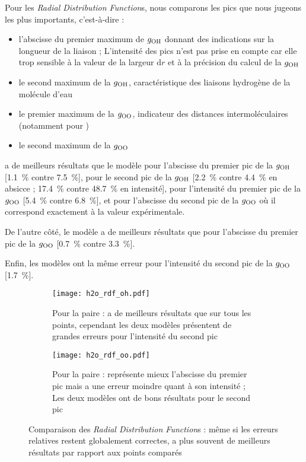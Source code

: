 Pour les \emph{Radial Distribution Function}s, nous comparons les pics que nous jugeons les plus importants, c'est-à-dire :
\begin{itemize}
    \item l'abscisse du premier maximum de $g_{\ce{OH}}$ donnant des indications sur la longueur de la liaison  ; L'intensité des pics n'est pas prise en compte car elle trop sensible à la valeur de la largeur $\mathrm{d}r$ et à la précision du calcul de la $g_{\ce{OH}}$
    \item le second maximum de la $g_{\ce{OH}}$, caractéristique des liaisons hydrogène de la molécule d'eau
    \item le premier maximum de la $g_{\ce{OO}}$, indicateur des distances intermoléculaires (notamment pour \spce{})
    \item le second maximum de la $g_{\ce{OO}}$
\end{itemize}

\reaxff{} a de meilleurs résultats que le modèle \spce{} pour l'abscisse du premier pic de la $g_{\ce{OH}}$ [\qty{1.1}{\percent} contre \qty{7.5}{\percent}], pour le second pic de la $g_{\ce{OH}}$ [\qty{2.2}{\percent} contre \qty{4.4}{\percent} en absicce ; \qty{17.4}{\percent} contre \qty{48.7}{\percent} en intensité], pour l'intensité du premier pic de la $g_{\ce{OO}}$ [\qty{5.4}{\percent} contre \qty{6.8}{\percent}], et pour l'abscisse du second pic de la $g_{\ce{OO}}$ où il correspond exactement à la valeur expérimentale.

De l'autre côté, le modèle \spce{} a de meilleurs résultats que \reaxff{} pour l'abscisse du premier pic de la $g_{\ce{OO}}$ [\qty{0.7}{\percent} contre \qty{3.3}{\percent}].

Enfin, les modèles ont la même erreur pour l'intensité du second pic de la $g_{\ce{OO}}$ [\qty{1.7}{\percent}].

\begin{figure}[h!]
    \centering
    \begin{subfigure}{\textwidth}
        \centering
        \texttt{[image: h2o\_rdf\_oh.pdf]}
        \caption{Pour la paire  : \reaxff{} a de meilleurs résultats que \spce{} sur tous les points, cependant les deux modèles présentent de grandes erreurs pour l'intensité du second pic}
        \label{fig:h2o_rdf_oh}
    \end{subfigure}

    \begin{subfigure}{\textwidth}
        \centering
        \texttt{[image: h2o\_rdf\_oo.pdf]}
        \caption{Pour la paire  : \spce{} représente mieux l'abscisse du premier pic mais \reaxff{} a une erreur moindre quant à son intensité ; Les deux modèles ont de bons résultats pour le second pic}
        \label{fig:h2o_rdf_oo}
    \end{subfigure}
    \caption{Comparaison des \emph{Radial Distribution Function}s : même si les erreurs relatives restent globalement correctes, \reaxff{} a plus souvent de meilleurs résultats par rapport aux points comparés}
    \label{fig:h2o_comparaison_resultats}
\end{figure}


